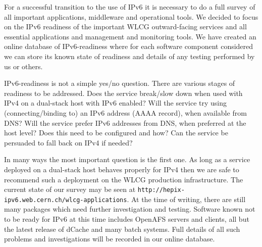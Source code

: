 For a successful transition to the use of IPv6 it is necessary to do a full survey of all important applications, middleware and operational tools. We decided to focus on the IPv6 readiness of the important WLCG outward-facing services and all essential applications and management and monitoring tools. We have created an online database of IPv6-readiness where for each software component considered we can store its known state of readiness and details of any testing performed by us or others.

IPv6-readiness is not a simple yes/no question. There are various stages of readiness to be addressed.
Does the service break/slow down when used with IPv4 on a dual-stack host with IPv6 enabled?
Will the service try using (connecting/binding to) an IPv6 address (AAAA record), when available from DNS?
Will the service prefer IPv6 addresses from DNS, when preferred at the host level?
Does this need to be configured and how?
Can the service be persuaded to fall back on IPv4 if needed?

In many ways the most important question is the first one. As long as a service deployed on a dual-stack host behaves properly for IPv4 then we are safe to recommend such a deployment on the WLCG production infrastructure. The current state of our survey may be seen at
{\tt http://hepix-ipv6.web.cern.ch/wlcg-applications}.
At the time of 
writing, there are still many packages which need further investigation and testing. Software known not to be ready for IPv6 at this time includes OpenAFS servers and clients, all but the latest release of dCache and many batch systems. Full details of all such problems and investigations will be recorded in our online database.


